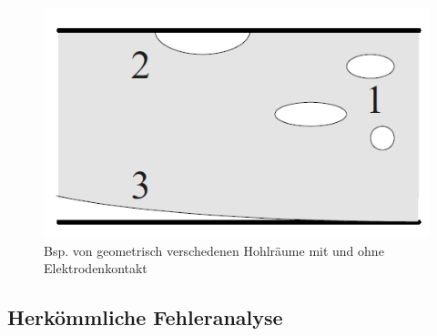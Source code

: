 \begin{refsection}
\begin{figure}
	\centering
	\includegraphics[width=0.5\linewidth]{papers/gis/Bilder/Hohlraum}
	\caption[]{Bsp. von geometrisch verschedenen Hohlräume mit und ohne Elektrodenkontakt \cite{buch:Kuchler}}
	\label{fig:hohlraum}
\end{figure}
  
\subsection{Herkömmliche Fehleranalyse}


\end{refsection}
